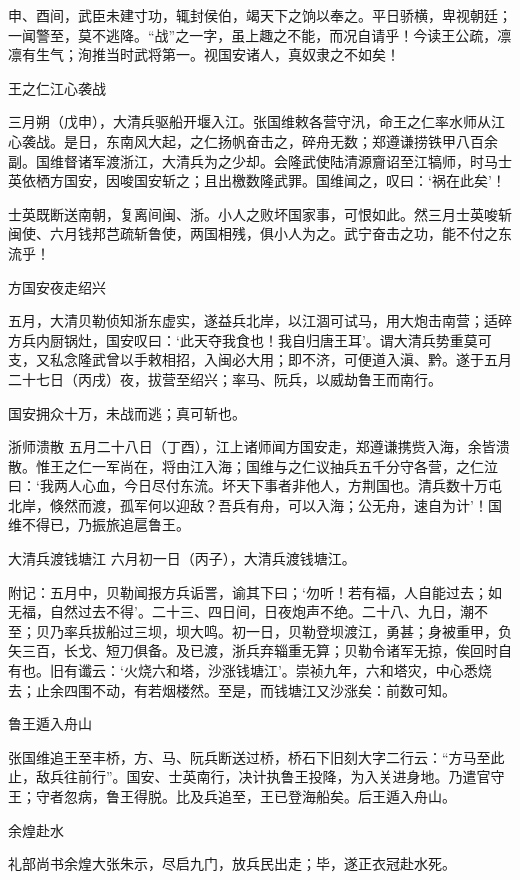 \documentclass[]{article}
\begin{document}
申、酉间，武臣未建寸功，辄封侯伯，竭天下之饷以奉之。平日骄横，卑视朝廷；一闻警至，莫不逃降。``战''之一字，虽上趣之不能，而况自请乎！今读王公疏，凛凛有生气；洵推当时武将第一。视国安诸人，真奴隶之不如矣！

王之仁江心袭战

三月朔（戊申），大清兵驱船开堰入江。张国维敕各营守汛，命王之仁率水师从江心袭战。是日，东南风大起，之仁扬帆奋击之，碎舟无数；郑遵谦捞铁甲八百余副。国维督诸军渡浙江，大清兵为之少却。会隆武使陆清源齎诏至江犒师，时马士英依栖方国安，因唆国安斩之；且出檄数隆武罪。国维闻之，叹曰：`祸在此矣'！

士英既断送南朝，复离间闽、浙。小人之败坏国家事，可恨如此。然三月士英唆斩闽使、六月钱邦芑疏斩鲁使，两国相残，俱小人为之。武宁奋击之功，能不付之东流乎！

方国安夜走绍兴

五月，大清贝勒侦知浙东虚实，遂益兵北岸，以江涸可试马，用大炮击南营；适碎方兵内厨锅灶，国安叹曰：`此天夺我食也！我自归唐王耳'。谓大清兵势重莫可支，又私念隆武曾以手敕相招，入闽必大用；即不济，可便道入滇、黔。遂于五月二十七日（丙戌）夜，拔营至绍兴；率马、阮兵，以威劫鲁王而南行。

国安拥众十万，未战而逃；真可斩也。

浙师溃散
五月二十八日（丁酉），江上诸师闻方国安走，郑遵谦携赀入海，余皆溃散。惟王之仁一军尚在，将由江入海；国维与之仁议抽兵五千分守各营，之仁泣曰：`我两人心血，今日尽付东流。坏天下事者非他人，方荆国也。清兵数十万屯北岸，倏然而渡，孤军何以迎敌？吾兵有舟，可以入海；公无舟，速自为计'！国维不得已，乃振旅追扈鲁王。

大清兵渡钱塘江 六月初一日（丙子），大清兵渡钱塘江。

附记：五月中，贝勒闻报方兵诟詈，谕其下曰；`勿听！若有福，人自能过去；如无福，自然过去不得'。二十三、四日间，日夜炮声不绝。二十八、九日，潮不至；贝乃率兵拔船过三坝，坝大鸣。初一日，贝勒登坝渡江，勇甚；身被重甲，负矢三百，长戈、短刀俱备。及已渡，浙兵弃辎重无算；贝勒令诸军无掠，俟回时自有也。旧有谶云：`火烧六和塔，沙涨钱塘江'。崇祯九年，六和塔灾，中心悉烧去；止余四围不动，有若烟楼然。至是，而钱塘江又沙涨矣：前数可知。

鲁王遁入舟山

张国维追王至丰桥，方、马、阮兵断送过桥，桥石下旧刻大字二行云：``方马至此止，敌兵往前行''。国安、士英南行，决计执鲁王投降，为入关进身地。乃遣官守王；守者忽病，鲁王得脱。比及兵追至，王已登海船矣。后王遁入舟山。

余煌赴水

礼部尚书余煌大张朱示，尽启九门，放兵民出走；毕，遂正衣冠赴水死。
\end{document}
